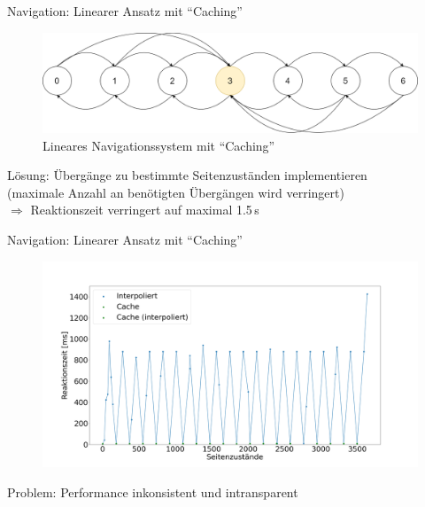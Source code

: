 \documentclass{beamer}
\begin{document}
\begin{frame}{Navigation: Linearer Ansatz mit ``Caching''}
\begin{figure}
\center
\begin{minipage}{\textwidth}
\includegraphics[width=\textwidth]{figures/navigationsystem-cache-overview-2.png}
\end{minipage}
\caption{Lineares Navigationssystem mit ``Caching''}
\end{figure}
Lösung: Übergänge zu bestimmte Seitenzuständen implementieren \\
\hspace{1em}(maximale Anzahl an benötigten Übergängen wird verringert)\\
$\Rightarrow$ Reaktionszeit verringert auf maximal 1.5\,s
\end{frame}

\begin{frame}{Navigation: Linearer Ansatz mit ``Caching''}
\begin{figure}
\center
\begin{minipage}{\textwidth}
\includegraphics[width=\textwidth]{figures/performance_cache.png}
\end{minipage}
\end{figure}
Problem: Performance inkonsistent und intransparent
\end{frame}
\end{document}
